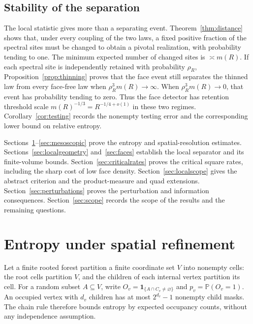 \documentclass[11pt]{amsart}
\theoremstyle{remark}
\newcommand{\Prob}{\mathbb P}
\newcommand{\one}{\mathbf 1}
\begin{document}
\subsection{Stability of the separation}

The local statistic gives more than a separating event. Theorem~\ref{thm:distance} shows that, under every coupling of the two laws, a fixed positive fraction of the spectral sites must be changed to obtain a pivotal realization, with probability tending to one. The minimum expected number of changed sites is $\asymp m(R)$. If each spectral site is independently retained with probability $\rho_R$, Proposition~\ref{prop:thinning} proves that the face event still separates the thinned law from every face-free law when $\rho_R^3m(R)\to\infty$. When $\rho_R^3m(R)\to0$, that event has probability tending to zero. Thus the face detector has retention threshold scale $m(R)^{-1/3}=R^{-1/4+o(1)}$ in these two regimes. Corollary~\ref{cor:testing} records the nonempty testing error and the corresponding lower bound on relative entropy.

Sections~\ref{sec:forest}--\ref{sec:mesoscopic} prove the entropy and spatial-resolution estimates. Sections~\ref{sec:localgeometry} and~\ref{sec:faces} establish the local separator and its finite-volume bounds. Section~\ref{sec:criticalrates} proves the critical square rates, including the sharp cost of low face density. Section~\ref{sec:localscope} gives the abstract criterion and the product-measure and quad extensions. Section~\ref{sec:perturbations} proves the perturbation and information consequences. Section~\ref{sec:scope} records the scope of the results and the remaining questions.

\section{Entropy under spatial refinement}\label{sec:forest}

Let a finite rooted forest partition a finite coordinate set $V$ into
nonempty cells: the root cells partition $V$, and the children of each
internal vertex partition its cell. For a random subset $A\subseteq V$,
write $O_v=\one_{\{A\cap C_v\ne\varnothing\}}$ and $p_v=\Prob(O_v=1)$.
An occupied vertex with $d_v$ children has at most $2^{d_v}-1$ nonempty
child masks. The chain rule therefore bounds entropy by expected
occupancy counts, without any independence assumption.
\end{document}
